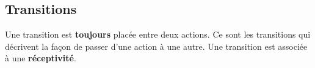 \subsection{Transitions}

Une transition est \textbf{toujours} placée entre deux actions. Ce sont les transitions qui décrivent la façon de passer d'une action à une autre.
Une transition est associée à une \textbf{réceptivité}.

